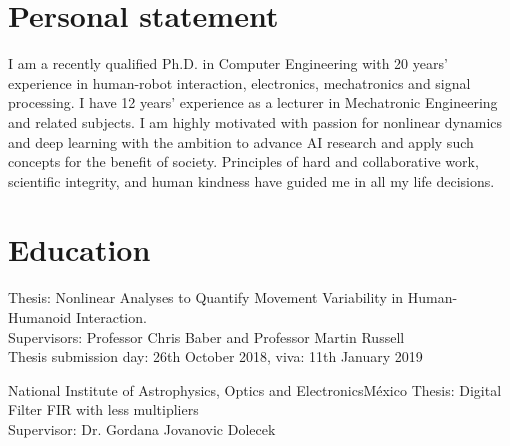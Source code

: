 \documentclass[10pt,a4paper,roman]{moderncv}
\begin{document}
\section{Personal statement}

\begin{changemargin}{2.4cm}{0.5cm}
I am a recently qualified Ph.D. in Computer Engineering with 20 years' experience 
in human-robot interaction, electronics, mechatronics and signal processing.
I have 12 years' experience as a lecturer in Mechatronic Engineering
and related subjects. I am highly motivated with passion for nonlinear dynamics 
and deep learning with the ambition to advance AI research and apply such 
concepts for the benefit of society.
Principles of hard and collaborative work, scientific integrity, 
and human kindness have guided me in all my life decisions. 
\end{changemargin}



\section{Education}
  {Thesis: Nonlinear  Analyses to Quantify Movement Variability in Human-Humanoid Interaction.
 \href{https://doi.org/10.5281/zenodo.1473140}{\faFilePdfO}
 \href{https://github.com/mxochicale/phd-thesis}{\faGithubAlt}
 \href{https://github.com/mxochicale/phd-thesis-code-data}{\faCode}
	\\ Supervisors: Professor Chris Baber and  Professor Martin Russell  
	\\ Thesis submission day: 26th October 2018, viva: 11th January 2019	
}

  {National Institute of Astrophysics, Optics and Electronics}{M\'exico}{}
  {Thesis: Digital Filter FIR with less multipliers
  \href{https://github.com/mxochicale/publications/blob/master/Thesis/M.Sc./doc/MPXochicale_MScThesis-2016.pdf}{\faFilePdfO}
  \href{https://github.com/mxochicale/publications/tree/master/Thesis/M.Sc.}{\faGithubAlt}
  \\ Supervisor: Dr. Gordana Jovanovic Dolecek}
\end{document}
